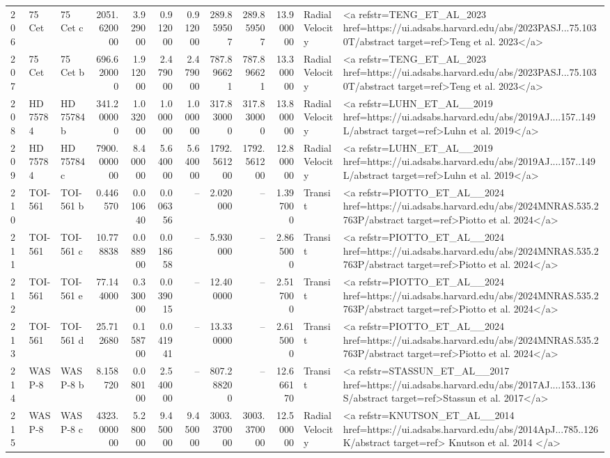 \begin{tabular}{lllrrrrrrrll}
206 & 75 Cet & 75 Cet c & 2051.620000 & 3.929000 & 0.912000 & 0.912000 & 289.859507 & 289.859507 & 13.900000 & Radial Velocity & <a refstr=TENG_ET_AL_2023 href=https://ui.adsabs.harvard.edu/abs/2023PASJ...75.1030T/abstract target=ref>Teng et al. 2023</a> \\
207 & 75 Cet & 75 Cet b & 696.620000 & 1.912000 & 2.479000 & 2.479000 & 787.896621 & 787.896621 & 13.300000 & Radial Velocity & <a refstr=TENG_ET_AL_2023 href=https://ui.adsabs.harvard.edu/abs/2023PASJ...75.1030T/abstract target=ref>Teng et al. 2023</a> \\
208 & HD 75784 & HD 75784 b & 341.200000 & 1.032000 & 1.000000 & 1.000000 & 317.830000 & 317.830000 & 13.800000 & Radial Velocity & <a refstr=LUHN_ET_AL__2019 href=https://ui.adsabs.harvard.edu/abs/2019AJ....157..149L/abstract target=ref>Luhn et al. 2019</a> \\
209 & HD 75784 & HD 75784 c & 7900.000000 & 8.400000 & 5.640000 & 5.640000 & 1792.561200 & 1792.561200 & 12.800000 & Radial Velocity & <a refstr=LUHN_ET_AL__2019 href=https://ui.adsabs.harvard.edu/abs/2019AJ....157..149L/abstract target=ref>Luhn et al. 2019</a> \\
210 & TOI-561 & TOI-561 b & 0.446570 & 0.010640 & 0.006356 & -- & 2.020000 & -- & 1.397000 & Transit & <a refstr=PIOTTO_ET_AL__2024 href=https://ui.adsabs.harvard.edu/abs/2024MNRAS.535.2763P/abstract target=ref>Piotto et al. 2024</a> \\
211 & TOI-561 & TOI-561 c & 10.778838 & 0.088900 & 0.018658 & -- & 5.930000 & -- & 2.865000 & Transit & <a refstr=PIOTTO_ET_AL__2024 href=https://ui.adsabs.harvard.edu/abs/2024MNRAS.535.2763P/abstract target=ref>Piotto et al. 2024</a> \\
212 & TOI-561 & TOI-561 e & 77.144000 & 0.330000 & 0.039015 & -- & 12.400000 & -- & 2.517000 & Transit & <a refstr=PIOTTO_ET_AL__2024 href=https://ui.adsabs.harvard.edu/abs/2024MNRAS.535.2763P/abstract target=ref>Piotto et al. 2024</a> \\
213 & TOI-561 & TOI-561 d & 25.712680 & 0.158700 & 0.041941 & -- & 13.330000 & -- & 2.615000 & Transit & <a refstr=PIOTTO_ET_AL__2024 href=https://ui.adsabs.harvard.edu/abs/2024MNRAS.535.2763P/abstract target=ref>Piotto et al. 2024</a> \\
214 & WASP-8 & WASP-8 b & 8.158720 & 0.080100 & 2.540000 & -- & 807.288200 & -- & 12.666170 & Transit & <a refstr=STASSUN_ET_AL__2017 href=https://ui.adsabs.harvard.edu/abs/2017AJ....153..136S/abstract target=ref>Stassun et al. 2017</a> \\
215 & WASP-8 & WASP-8 c & 4323.000000 & 5.280000 & 9.450000 & 9.450000 & 3003.370000 & 3003.370000 & 12.500000 & Radial Velocity & <a refstr=KNUTSON_ET_AL__2014 href=https://ui.adsabs.harvard.edu/abs/2014ApJ...785..126K/abstract target=ref> Knutson et al. 2014 </a> \\

\end{tabular}
